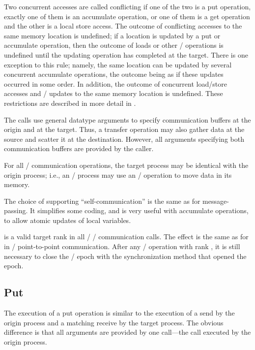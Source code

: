 Two concurrent accesses are called conflicting if one of the two is a put operation, exactly one of them is an
accumulate operation, or one of them is a get operation and the other is a local store access.
The outcome of conflicting
accesses to the same memory location is undefined;
if a location is updated by a put or accumulate operation, then 
the outcome of loads or other \RMA/ operations is undefined
until the updating operation has completed at the target.
There is one exception to this rule; namely, the same location can be
updated by several concurrent accumulate operations, the outcome being as
if these updates occurred in some order.  In addition, 
the outcome of concurrent load/store accesses and \RMA/ updates to the same memory location is undefined.
These restrictions
are described in more detail in
.

The calls use general datatype arguments to specify communication
buffers at the origin and at the target.  Thus, a transfer operation
may also gather data at the source and scatter it at the destination.
However, all arguments specifying both communication buffers are
provided by the caller.

For all \RMA/ communication operations, the target process may be identical with the
origin process;
i.e., an \mpi/ process may use an \RMA/ operation to move data in its memory.

\begin{rationale}
The choice of supporting ``self-communication'' is the same as for
message-passing.
It simplifies some coding, and is very useful with accumulate
operations, to allow atomic updates of local variables.
\end{rationale}

 is a valid target rank in all \MPI/ \RMA/ communication calls.  
The effect is the same as for  in \MPI/ point-to-point
communication.
After any \RMA/ operation with rank , it is still necessary to
close the \RMA/ epoch with the synchronization method that opened the epoch. 

\subsection{Put}
\label{sec:onesided-put}
The execution of a put operation is similar to the execution of a
send by the origin process and a matching receive by the target process.
The obvious difference is that all arguments are provided by one
call---the call executed by the origin process.

